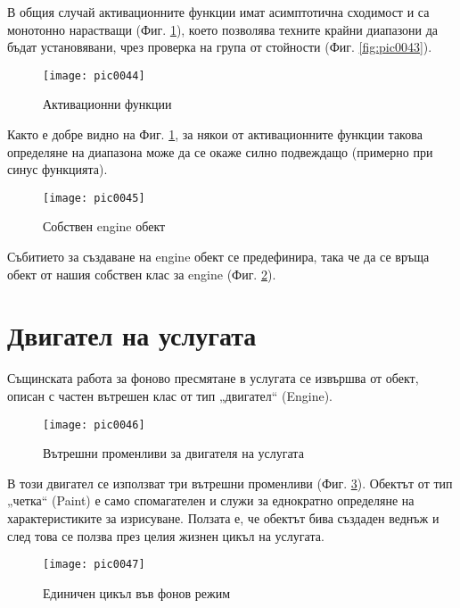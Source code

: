 В общия случай активационните функции имат асимптотична сходимост и са монотонно нарастващи (Фиг. \ref{fig:pic0044}), което позволява техните крайни диапазони да бъдат установявани, чрез проверка на група от стойности (Фиг. \ref{fig:pic0043}).

\begin{figure}[h]
  \centering
  \texttt{[image: pic0044]}
  \caption{Активационни функции \cite{afwiki}}
\label{fig:pic0044}
\end{figure}
\FloatBarrier

Както е добре видно на Фиг. \ref{fig:pic0044}, за някои от активационните функции такова определяне на диапазона може да се окаже силно подвеждащо (примерно при синус функцията). 

\begin{figure}[h]
  \centering
  \texttt{[image: pic0045]}
  \caption{Собствен engine обект}
\label{fig:pic0045}
\end{figure}
\FloatBarrier

Събитието за създаване на engine обект се предефинира, така че да се връща обект от нашия собствен клас за engine (Фиг. \ref{fig:pic0045}). 

\section{Двигател на услугата}

Същинската работа за фоново пресмятане в услугата се извършва от обект, описан с частен вътрешен клас от тип „двигател“ (Engine).

\begin{figure}[h]
  \centering
  \texttt{[image: pic0046]}
  \caption{Вътрешни променливи за двигателя на услугата}
\label{fig:pic0046}
\end{figure}
\FloatBarrier

В този двигател се използват три вътрешни променливи (Фиг. \ref{fig:pic0046}). Обектът от тип „четка“ (Paint) е само спомагателен и служи за еднократно определяне на характеристиките за изрисуване. Ползата е, че обектът бива създаден веднъж и след това се ползва през целия жизнен цикъл на услугата. 

\begin{figure}[h]
  \centering
  \texttt{[image: pic0047]}
  \caption{Единичен цикъл във фонов режим}
\label{fig:pic0047}
\end{figure}
\FloatBarrier

